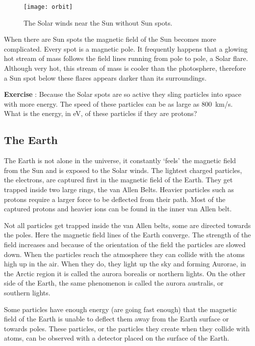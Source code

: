 \begin{figure}\begin{center}
\texttt{[image: orbit]}
\caption{The Solar winds near the Sun without Sun spots.} \label{fig:sun_field}
\end{center}\end{figure}

When there are Sun spots the magnetic field of the Sun becomes more complicated. Every spot is a magnetic pole. It frequently happens that a glowing hot stream of mass follows the field lines running from pole to pole, a Solar flare. Although very hot, this stream of mass is cooler than the photosphere, therefore a Sun spot below these flares appears darker than its surroundings.

\begin{shaded}
\textbf{Exercise \theExercise {}} : Because the Solar spots are so active they sling particles into space with more energy. The speed of these particles can be as large as 800~km/s. What is the energy, in eV, of these particles if they are protons?\end{shaded}

\subsection{The Earth}
The Earth is not alone in the universe, it constantly `feels' the magnetic field from the Sun and is exposed to the Solar winds. The lightest charged particles, the electrons, are captured first in the magnetic field of the Earth. They get trapped inside two large rings, the van Allen Belts. Heavier particles such as protons require a larger force to be deflected from their path. Most of the captured protons and heavier ions can be found in the inner van Allen belt.

Not all particles get trapped inside the van Allen belts, some are directed towards the poles. Here the magnetic field lines of the Earth converge. The strength of the field increases and because of the orientation of the field the particles are slowed down. When the particles reach the atmosphere they can collide with the atoms high up in the air. When they do, they light up the sky and forming Aurorae, in the Arctic region it is called the aurora borealis or northern lights. On the other side of the Earth, the same phenomenon is called the aurora australis, or southern lights.

Some particles have enough energy (are going fast enough) that the magnetic field of the Earth is unable to deflect them away from the Earth surface or towards poles. These particles, or the particles they create when they collide with atoms, can be observed with a detector placed on the surface of the Earth.


